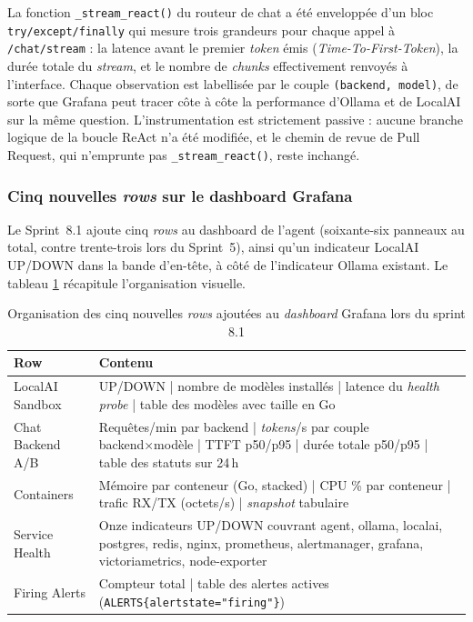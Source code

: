         La fonction \texttt{\_\allowbreak{}stream\_\allowbreak{}react()} du routeur de chat a été enveloppée d'un
        bloc \texttt{try/\allowbreak{}except/\allowbreak{}finally} qui mesure trois grandeurs pour chaque appel
        à \texttt{/\allowbreak{}chat/\allowbreak{}stream} : la latence avant le premier \textit{token} émis
        (\textit{Time-To-First-Token}), la durée totale du \textit{stream}, et le
        nombre de \textit{chunks} effectivement renvoyés à l'interface. Chaque
        observation est labellisée par le couple \texttt{(backend, model)}, de sorte
        que Grafana peut tracer côte à côte la performance d'Ollama et de LocalAI sur
        la même question. L'instrumentation est strictement passive : aucune branche
        logique de la boucle ReAct n'a été modifiée, et le chemin de revue de Pull
        Request, qui n'emprunte pas \texttt{\_\allowbreak{}stream\_\allowbreak{}react()}, reste inchangé.

        \subsubsection{Cinq nouvelles \textit{rows} sur le dashboard Grafana}

        Le Sprint~8.1 ajoute cinq \textit{rows} au dashboard de l'agent (soixante-six
        panneaux au total, contre trente-trois lors du Sprint~5), ainsi qu'un
        indicateur LocalAI UP/DOWN dans la bande d'en-tête, à côté de l'indicateur
        Ollama existant. Le tableau \ref{tab:grafana_rows_8_1} récapitule
        l'organisation visuelle.

        \begin{table}[H]
        \centering
        \footnotesize
        \begin{tabular}{|p{4.2cm}|p{10.5cm}|}
        \hline
        \textbf{Row} & \textbf{Contenu} \\
        \hline
        LocalAI Sandbox & UP/DOWN \;|\; nombre de modèles installés \;|\; latence du \textit{health probe} \;|\; table des modèles avec taille en Go \\
        \hline
        Chat Backend A/B & Requêtes/min par backend \;|\; \textit{tokens}/s par couple backend×modèle \;|\; TTFT p50/p95 \;|\; durée totale p50/p95 \;|\; table des statuts sur 24\,h \\
        \hline
        Containers & Mémoire par conteneur (Go, stacked) \;|\; CPU \% par conteneur \;|\; trafic RX/TX (octets/s) \;|\; \textit{snapshot} tabulaire \\
        \hline
        Service Health & Onze indicateurs UP/DOWN couvrant agent, ollama, localai, postgres, redis, nginx, prometheus, alertmanager, grafana, victoriametrics, node-exporter \\
        \hline
        Firing Alerts & Compteur total \;|\; table des alertes actives (\texttt{ALERTS\{alertstate="firing"\}}) \\
        \hline
        \end{tabular}
        \caption{Organisation des cinq nouvelles \textit{rows} ajoutées au \textit{dashboard} Grafana lors du sprint 8.1}
        \label{tab:grafana_rows_8_1}
        \end{table}

